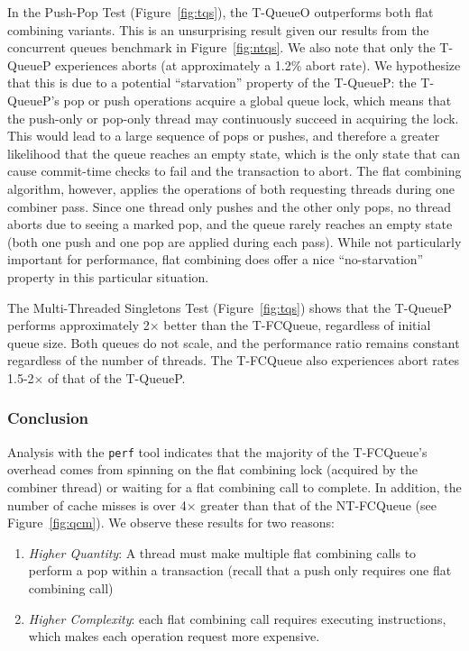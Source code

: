 In the Push-Pop Test (Figure~\ref{fig:tqs}), the T-QueueO outperforms both flat combining variants. This is an unsurprising result given our results from the concurrent queues benchmark in Figure~\ref{fig:ntqs}. We also note that only the T-QueueP experiences aborts (at approximately a 1.2\% abort rate). We hypothesize that this is due to a potential ``starvation'' property of the T-QueueP: the T-QueueP's pop or push operations acquire a global queue lock, which means that the push-only or pop-only thread may continuously succeed in acquiring the lock. This would lead to a large sequence of pops or pushes, and therefore a greater likelihood that the queue reaches an empty state, which is the only state that can cause commit-time checks to fail and the transaction to abort. The flat combining algorithm, however, applies the operations of both requesting threads during one combiner pass. Since one thread only pushes and the other only pops, no thread aborts due to seeing a marked pop, and the queue rarely reaches an empty state (both one push and one pop are applied during each pass). While not particularly important for performance, flat combining does offer a nice ``no-starvation'' property in this particular situation.

The Multi-Threaded Singletons Test (Figure~\ref{fig:tqs}) shows that the T-QueueP performs approximately 2$\times$ better than the T-FCQueue, regardless of initial queue size. Both queues do not scale, and the performance ratio remains constant regardless of the number of threads. The T-FCQueue also experiences abort rates 1.5-2$\times$ of that of the T-QueueP.

\vspace{12pt}
\noindent{}

\subsubsection{Conclusion}
Analysis with the \texttt{perf} tool indicates that the majority of the T-FCQueue's overhead comes from spinning on the flat combining lock (acquired by the combiner thread) or waiting for a flat combining call to complete. In addition, the number of cache misses is over 4$\times$ greater than that of the NT-FCQueue (see Figure~\ref{fig:qcm}). We observe these results for two reasons:
\begin{enumerate}
\item \emph{Higher Quantity}: A thread must make multiple flat combining calls to perform a pop within a transaction (recall that a push only requires one flat combining call) 
\item \emph{Higher Complexity}: each flat combining call requires executing instructions, which makes each operation request more expensive.
\end{enumerate}

